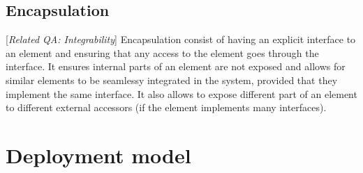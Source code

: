 \documentclass{article}
\begin{document}
\subsection{Encapsulation}[\textit{Related QA: Integrability}]
Encapsulation consist of having an explicit interface to an element and ensuring that any access to the element goes through the interface. It ensures internal parts of an element are not exposed and allows for similar elements to be seamlessy integrated in the system, provided that they implement the same interface. It also allows to expose different part of an element to different external accessors (if the element implements many interfaces).

\section{Deployment model}
\end{document}
